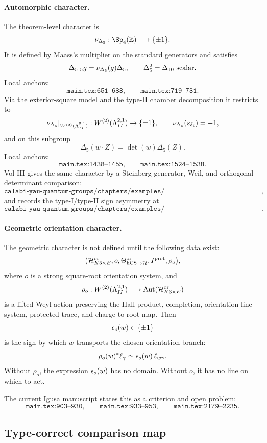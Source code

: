\paragraph{Automorphic character.}
The theorem-level character is
\[
\nuDelta:\Sp_4(\Z)\longrightarrow\{\pm1\}.
\]
It is defined by Maass's multiplier on the standard generators and
satisfies
\[
\Delta_5|_5g=\nu_{\Delta_5}(g)\Delta_5,
\qquad
\Delta_5^2=\Delta_{10}\ \hbox{scalar}.
\]
Local anchors:
\[
\texttt{main.tex:651--683},\qquad
\texttt{main.tex:719--731}.
\]
Via the exterior-square model and the type-II chamber decomposition it
restricts to
\[
\nu_{\Delta_5}|_{W^{(2)}(\Lambda^{2,1}_{II})}:W^{(2)}(\Lambda^{2,1}_{II})\to\{\pm1\},
\qquad
\nu_{\Delta_5}(s_{\delta_i})=-1,
\]
and on this subgroup
\[
\Delta_5(w\cdot Z)=\det(w)\Delta_5(Z).
\]
Local anchors:
\[
\texttt{main.tex:1438--1455},\qquad
\texttt{main.tex:1524--1538}.
\]
Vol III gives the same character by a Steinberg-generator, Weil, and
orthogonal-determinant comparison:
\[
\texttt{calabi-yau-quantum-groups/chapters/examples/cy\_d\_kappa\_stratification.tex:3750--3784},
\]
and records the type-I/type-II sign asymmetry at
\[
\texttt{calabi-yau-quantum-groups/chapters/examples/cy\_d\_kappa\_stratification.tex:4061--4085}.
\]

\paragraph{Geometric orientation character.}
The geometric character is not defined until the following data exist:
\[
\bigl(\mathcal H^{\mathrm{or}}_{K3\times E},o,\Theta_{\mathrm{hCS}\to\mathcal H}^{\mathrm{or}},
I^{\mathrm{prot}},\rho_o\bigr),
\]
where \(o\) is a strong square-root orientation system, and
\[
\rho_o:W^{(2)}(\Lambda^{2,1}_{II})
\longrightarrow
\operatorname{Aut}(\mathcal H^{\mathrm{or}}_{K3\times E})
\]
is a lifted Weyl action preserving the Hall product, completion,
orientation line system, protected trace, and charge-to-root map.  Then
\[
\epsilon_o(w)\in\{\pm1\}
\]
is the sign by which \(w\) transports the chosen orientation branch:
\[
\rho_o(w)^*\ell_\gamma\simeq \epsilon_o(w)\,\ell_{w\gamma}.
\]
Without \(\rho_o\), the expression \(\epsilon_o(w)\) has no domain.
Without \(o\), it has no line on which to act.

The current Igusa manuscript states this as a criterion and open problem:
\[
\texttt{main.tex:903--930},\qquad
\texttt{main.tex:933--953},\qquad
\texttt{main.tex:2179--2235}.
\]

\subsection{Type-correct comparison map}

